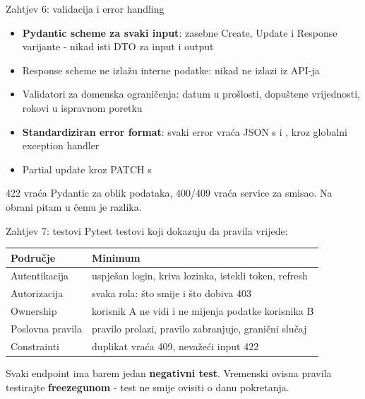 \begin{frame}{Zahtjev 6: validacija i error handling}
\begin{itemize}
  \item \textbf{Pydantic scheme za svaki input}: zasebne Create, Update i Response varijante - nikad isti DTO za input i output
  \item Response scheme ne izlažu interne podatke:  nikad ne izlazi iz API-ja
  \item Validatori za domenska ograničenja: datum u prošlosti, dopuštene vrijednosti, rokovi u ispravnom poretku
  \item \textbf{Standardiziran error format}: svaki error vraća JSON s  i , kroz globalni exception handler
  \item Partial update kroz PATCH s 
\end{itemize}

\vspace{0.4em}
422 vraća Pydantic za oblik podataka, 400/409 vraća service za smisao. Na obrani pitam u čemu je razlika.
\end{frame}

\begin{frame}{Zahtjev 7: testovi}
Pytest testovi koji dokazuju da pravila vrijede:

\vspace{0.4em}
\begin{tabular}{@{}lp{7cm}@{}}
  \toprule
  \textbf{Područje} & \textbf{Minimum} \\
  \midrule
  Autentikacija & uspješan login, kriva lozinka, istekli token, refresh \\
  Autorizacija & svaka rola: što smije i što dobiva 403 \\
  Ownership & korisnik A ne vidi i ne mijenja podatke korisnika B \\
  Poslovna pravila & pravilo prolazi, pravilo zabranjuje, granični slučaj \\
  Constrainti & duplikat vraća 409, nevažeći input 422 \\
  \bottomrule
\end{tabular}

\vspace{0.6em}
Svaki endpoint ima barem jedan \textbf{negativni test}. Vremenski ovisna pravila testirajte \textbf{freezegunom} - test ne smije ovisiti o danu pokretanja.
\end{frame}

